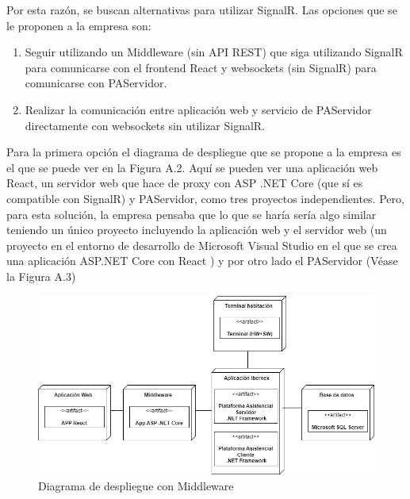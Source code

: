 Por esta razón, se buscan alternativas para utilizar SignalR. Las opciones que se le proponen a la empresa son: 
\begin{enumerate}
    \item Seguir utilizando un Middleware (sin API REST) que siga utilizando SignalR para comunicarse con el frontend React y websockets (sin SignalR) para comunicarse con PAServidor.
    \item Realizar la comunicación entre aplicación web y servicio de PAServidor directamente con websockets sin utilizar SignalR.
\end{enumerate}

Para la primera opción el diagrama de despliegue que se propone a la empresa es el que se puede ver en la Figura A.2. Aquí se pueden ver una aplicación web React, un servidor web que hace de proxy con ASP .NET Core (que sí es compatible con SignalR) y PAServidor, como tres proyectos independientes. Pero, para esta solución, la empresa pensaba que lo que se haría sería algo similar teniendo un único proyecto incluyendo la aplicación web y el servidor web (un proyecto en el entorno de desarrollo de Microsoft Visual Studio en el que se crea una aplicación ASP.NET Core con React \cite{vs-project} ) y por otro lado el PAServidor (Véase la Figura A.3)\\

\begin{figure}[H]
    \centering
    \includegraphics[width=15cm]{Imagenes/Arquitectura-despliegue-2}
    \caption{Diagrama de despliegue con Middleware}
    \label{fig:despliegue-2}
\end{figure}


